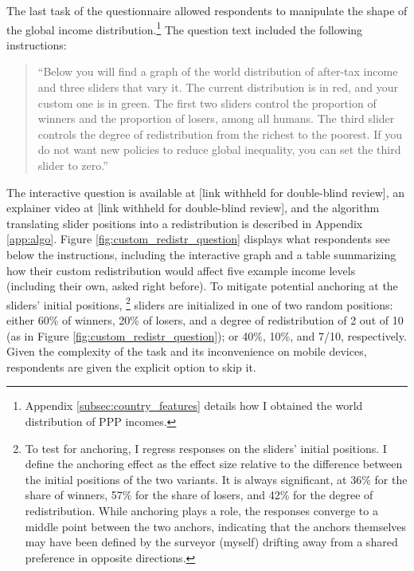 \documentclass[12pt,english]{article}
\begin{document}
\begin{bibunit}
The last task of the questionnaire allowed respondents to manipulate the shape of the global income distribution.\footnote{Appendix \ref{subsec:country_features} details how I obtained the world distribution of PPP incomes. } The question text included the following instructions: 
\begin{quote}``Below you will find a graph of the world distribution of after-tax income and three sliders that vary it. The current distribution is in red, and your custom one is in green. The first two sliders control the proportion of winners and the proportion of losers, among all humans. The third slider controls the degree of redistribution from the richest to the poorest. 
If you do not want new policies to reduce global inequality, you can set the third slider to zero.''\end{quote} 
The interactive question is available at [link withheld for double-blind review], an explainer video at [link withheld for double-blind review], and the algorithm translating slider positions into a redistribution is described in Appendix \ref{app:algo}. 
Figure \ref{fig:custom_redistr_question} displays what respondents see below the instructions, including the interactive graph and a table summarizing how their custom redistribution would affect five example income levels (including their own, asked right before). To mitigate potential anchoring at the sliders' initial positions,%
\footnote{To test for anchoring, I regress responses on the sliders' initial positions. %
I define the anchoring effect as the effect size relative to the difference between the initial positions of the two variants. It is always significant, at 36\% for the share of winners, 57\% for the share of losers, and 42\% for the degree of redistribution. While anchoring plays a role, the responses converge to a middle point between the two anchors, indicating that the anchors themselves may have been defined by the surveyor (myself) drifting away from a shared preference in opposite directions. %
} 
sliders are initialized in one of two random positions: %
either %
60\% of winners, 20\% of losers, and a degree of redistribution of 2 out of 10 (as in Figure \ref{fig:custom_redistr_question}); or %
40\%, 10\%, and 7/10, respectively. 
Given the complexity of the task and its inconvenience on mobile devices, respondents are given the explicit option to skip it. 


\end{bibunit}
\end{document}
